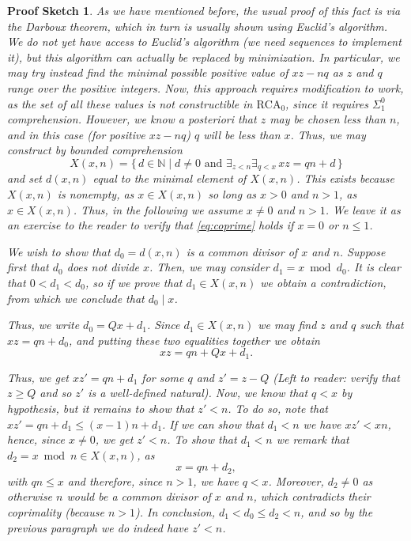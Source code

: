 \documentclass{article}
\theoremstyle{nonumberplain}
\newtheorem{sketch}{Proof Sketch}
\newcommand{\N}{\mathbb{N}}
\newcommand{\RCA}{\mathrm{RCA}}
\begin{document}
\begin{sketch}
As we have mentioned before, the usual proof of this fact is via the Darboux theorem, which in turn is usually shown using Euclid's algorithm. We do not yet have access to Euclid's algorithm (we need sequences to implement it), but this algorithm can actually be replaced by minimization. In particular, we may try instead find the minimal possible positive value of $xz - nq$ as $z$ and $q$ range over the positive integers. Now, this approach requires modification to work, as the set of all these values is not constructible in $\RCA_0$, since it requires $\Sigma^0_1$ comprehension. However, we know \textit{a posteriori} that $z$ may be chosen less than $n$, and in this case (for positive $xz-nq$) $q$ will be less than $x$. Thus, we may construct by bounded comprehension
\begin{equation}
X(x,n) = \{\, d \in \N \mid d \neq 0 \text{ and }\exists_{z < n} \exists_{q < x}\, xz = qn + d \,\}
\end{equation}
and set $d(x,n)$ equal to the minimal element of $X(x,n)$. This exists because $X(x,n)$ is nonempty, as $x \in X(x,n)$ so long as $x > 0$ and $n > 1$, as $x \in X(x,n)$. Thus, \emph{in the following we assume $x \neq 0$ and $n > 1$}. We leave it as an exercise to the reader to verify that \eqref{eq:coprime} holds if $x = 0$ or $n \leq 1$.

We wish to show that $d_0 = d(x,n)$ is a common divisor of $x$ and $n$. Suppose first that $d_0$ does not divide $x$. Then, we may consider $d_1 = x \bmod d_0$. It is clear that $0 < d_1 < d_0$, so if we prove that $d_1 \in X(x,n)$ we obtain a contradiction, from which we conclude that $d_0 \mid x$.

Thus, we write $d_0 = Q x + d_1$. Since $d_1 \in X(x,n)$ we may find $z$ and $q$ such that $xz = qn + d_0$, and putting these two equalities together we obtain
\begin{equation}
xz = qn + Qx + d_1.
\end{equation}

Thus, we get $x z' = qn  + d_1$ for some $q$ and $z' = z - Q$ (Left to reader: verify that $z \geq Q$ and so $z'$ is a well-defined natural). Now, we know that $q < x$ by hypothesis, but it remains to show that $z' < n$. To do so, note that $x z' = qn + d_1 \leq (x-1)n + d_1$. If we can show that $d_1 < n$ we have $xz' < xn$, hence, since $x \neq 0$, we get $z' < n$. To show that $d_1 < n$ we remark that $d_2 = x \bmod n \in X(x,n)$, as
\begin{equation}
x = qn + d_2,
\end{equation}
with $qn \leq x$ and therefore, since $n > 1$, we have $q < x$. Moreover, $d_2 \neq 0$ as otherwise $n$ would be a common divisor of $x$ and $n$, which contradicts their coprimality (because $n > 1$). In conclusion, $d_1 < d_0 \leq d_2 < n$, and so by the previous paragraph we do indeed have $z' < n$.


\end{sketch}
\end{document}
